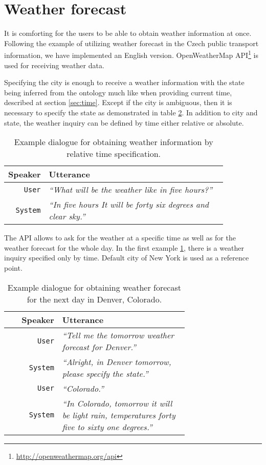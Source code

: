 \section{Weather forecast}

It is comforting for the users to be able to obtain weather information at once.
Following the example of utilizing weather forecast in the Czech public transport information, we have implemented an English version.
OpenWeatherMap \ac{API}\footnote{\url{http://openweathermap.org/api}} is used for receiving weather data.

Specifying the city is enough to receive a weather information with the state being inferred from the ontology much like when providing current time, described at section \ref{sec:time}.
Except if the city is ambiguous, then it is necessary to specify the state as demonstrated in table \ref{table:forecast}.
In addition to city and state, the weather inquiry can be defined by time either relative or absolute.

\begin{table}[h]
\centering
\begin{tabular}{ | r | p{0.85\linewidth} | } \hline
	\textbf{Speaker} & \textbf{Utterance} \\ \hline
	\texttt{User} & \textit{``What will be the weather like in five hours?''} \\ \hline
	\texttt{System} & \textit{``In five hours It will be forty six degrees and clear sky.''} \\ \hline
\end{tabular}
\caption[Weather inquiry by relative time]{Example dialogue for obtaining weather information by relative time specification.}
\label{table:weather}
\end{table}

The \ac{API} allows to ask for the weather at a specific time as well as for the weather forecast for the whole day.
In the first example \ref{table:weather}, there is a weather inquiry specified only by time.
Default city of New York is used as a reference point.

\begin{table}[h]
\centering
\begin{tabular}{ | r | p{0.7\linewidth} | } \hline
	\textbf{Speaker} & \textbf{Utterance} \\ \hline
	\texttt{User} & \textit{``Tell me the tomorrow weather forecast for Denver.''} \\ \hline
	\texttt{System} & \textit{``Alright, in Denver tomorrow, please specify the state.''} \\ \hline
	\texttt{User} & \textit{``Colorado.''} \\ \hline
	\texttt{System} & \textit{``In Colorado, tomorrow it will be light rain, temperatures forty five to sixty one degrees.''} \\ \hline
\end{tabular}
\caption[Weather forecast for the next day in Denver, Colorado]{Example dialogue for obtaining weather forecast for the next day in Denver, Colorado.}
\label{table:forecast}
\end{table}

